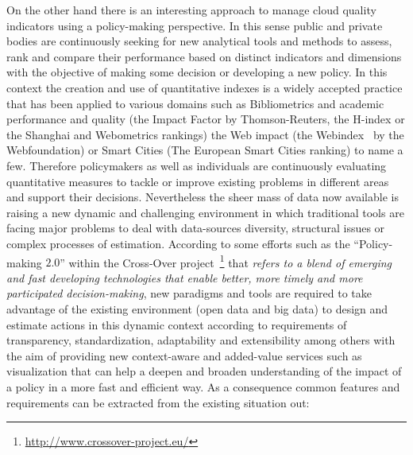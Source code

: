 On the other hand there is an interesting approach to manage cloud quality indicators using a policy-making 
perspective. In this sense public and private bodies are continuously seeking for new analytical tools and methods to 
assess, rank and compare their performance based on distinct indicators and dimensions with the objective of making 
some decision or developing a new policy. In this context the creation and use of quantitative indexes is 
a widely accepted practice that has been applied to various domains such as Bibliometrics and academic performance and 
quality (the Impact Factor by Thomson-Reuters, the H-index or the Shanghai and Webometrics rankings) the Web impact (the Webindex~\cite{webindexlod} 
by the Webfoundation) or Smart Cities (The European Smart Cities ranking) to name a few. Therefore policymakers as well as individuals are 
continuously evaluating quantitative measures to tackle or improve existing problems in different areas and 
support their decisions. Nevertheless the sheer mass of data now available is raising a new dynamic and challenging environment 
in which traditional tools are facing major problems to deal with data-sources diversity, structural issues or complex processes of estimation. 
According to some efforts such as the ``Policy-making $2.0$'' within the Cross-Over project~\footnote{\url{http://www.crossover-project.eu/}} 
that \textit{refers to a blend of emerging and fast developing technologies that enable better, more timely and more participated decision-making}, 
new paradigms and tools are required to take advantage of the existing environment (open data and big data) to design and estimate 
actions in this dynamic context according to requirements of transparency, standardization, adaptability and extensibility among 
others with the aim of providing new context-aware and added-value services such as visualization that 
can help a deepen and broaden understanding of the impact of a policy in a more fast and efficient way. 
As a consequence common features and requirements can be extracted from the existing situation out:
